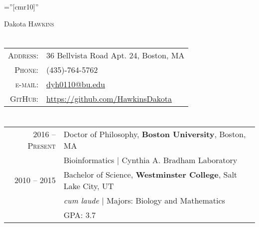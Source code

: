 \documentclass[a4paper,10pt]{article}
\begin{document}
\pagestyle{empty} %

\font\fb=''[cmr10]'' %

\par{\centering
		{\Huge Dakota \textsc{Hawkins}
	}\bigskip\par}

\section{\color{linkcolour}{Contact}}

\begin{tabular}{rl}
    \textsc{Address:} & 36 Bellvista Road Apt. 24, Boston, MA \\
    \textsc{Phone:}   & (435)-764-5762 \\
    \textsc{e-mail:}  & \href{mailto:dyh0110@bu.edu}{dyh0110@bu.edu} \\
    \textsc{GitHub:}  & \href{https://github.com/HawkinsDakota}{https://github.com/HawkinsDakota}
\end{tabular}

\section{\color{linkcolour}{Education}}
\begin{tabular}{rl}
\textsc{2016 -- Present} & Doctor of Philosophy, \textbf{Boston University}, Boston, MA \\
& Bioinformatics | Cynthia A. Bradham Laboratory \\

 \textsc{2010 -- 2015} & Bachelor of Science, \textbf{Westminster College}, Salt Lake City, UT\\
& \small\emph{cum laude} | Majors: Biology and Mathematics\\
&\normalsize \textsc{GPA}: 3.7
\end{tabular}

\end{document}
